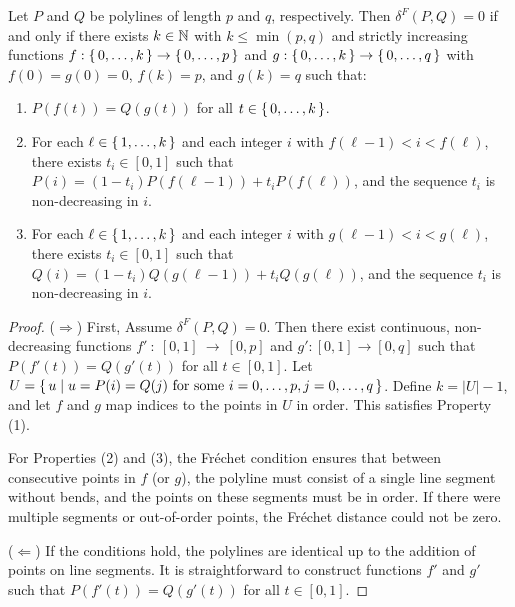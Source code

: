 \begin{lemma}\label{lem:polyline_dist0}
	Let \(P\) and \(Q\) be polylines of length \(p\) and \(q\), respectively. Then \(\delta^F(P, Q) = 0\) if and only if there exists \(k \in \mathbb{N}\) with \(k \leq \min(p, q)\) and strictly increasing functions \(f:\set{0,\dots,k} \to \set{0,\dots,p}\) and \(g:\set{0,\dots,k} \to \set{0,\dots,q}\) with \(f(0) = g(0) = 0\), \(f(k) = p\), and \(g(k) = q\) such that:
	\begin{enumerate}
		\item \(P(f(t)) = Q(g(t))\) for all \(t \in \set{0, \dots, k}\).
		\item For each \(\ell \in \set{1, \dots, k}\) and each integer \(i\) with \(f(\ell-1) < i < f(\ell)\), there exists \(t_i \in [0,1]\) such that \(P(i) = (1-t_i)P(f(\ell-1)) + t_iP(f(\ell))\), and the sequence \(t_i\) is non-decreasing in \(i\).
		\item For each \(\ell \in \set{1, \dots, k}\) and each integer \(i\) with \(g(\ell-1) < i < g(\ell)\), there exists \(t_i \in [0,1]\) such that \(Q(i) = (1-t_i)Q(g(\ell-1)) + t_iQ(g(\ell))\), and the sequence \(t_i\) is non-decreasing in \(i\).
	\end{enumerate}
\end{lemma}

\begin{proof}
	(\(\Rightarrow\)) First, Assume \(\delta^F(P, Q) = 0\). Then there exist continuous, non-decreasing functions \(f'~:~[0,1]~\to~[0,p]\) and \(g':[0,1] \to [0,q]\) such that \(P(f'(t)) = Q(g'(t))\) for all \(t \in [0,1]\). \newline Let \(U = \set{u \mid u = P(i) = Q(j) \text{ for some } i=0,\dots,p, j=0,\dots,q}\). Define \(k = |U| - 1\), and let \(f\) and \(g\) map indices to the points in \(U\) in order. This satisfies Property (1).

	For Properties (2) and (3), the Fréchet condition ensures that between consecutive points in \(f\) (or \(g\)), the polyline must consist of a single line segment without bends, and the points on these segments must be in order. If there were multiple segments or out-of-order points, the Fréchet distance could not be zero.

	(\(\Leftarrow\)) If the conditions hold, the polylines are identical up to the addition of points on line segments. It is straightforward to construct functions \(f'\) and \(g'\) such that \(P(f'(t)) = Q(g'(t))\) for all \(t \in [0, 1]\).
\end{proof}

